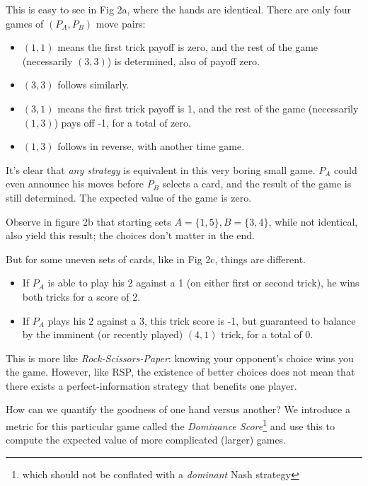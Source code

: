 \documentclass[11pt, oneside]{article} 	%
\begin{document}
This is easy to see in Fig 2a, where the hands are identical. There are only four games of $(P_A, P_B)$ move pairs:
\begin{itemize}
\item $(1,1)$ means the first trick payoff is zero, and the rest of the game (necessarily $(3,3)$) is determined, also of payoff zero.
\item $(3,3)$ follows similarly.
\item $(3,1)$ means the first trick payoff is 1, and the rest of the game (necessarily $(1,3)$) pays off -1, for a total of zero.
\item $(1,3)$ follows in reverse, with another time game.
\end{itemize}

It's clear that \emph{any strategy} is equivalent in this very boring small game. $P_A$ could even announce his moves before $P_B$ selects a card, and the result of the game is still determined. The expected value of the game is zero.

Observe in figure 2b that starting sets $A =\{1,5\}, B= \{3,4\}$, while not identical, also yield this result; the choices don't matter in the end.

But for some uneven sets of cards, like in Fig 2c, things are different.
\begin{itemize}
\item If $P_A$ is able to play his 2 against a 1 (on either first or second trick), he wins both tricks for a score of 2.
\item If $P_A$ plays his 2 against a 3, this trick score is -1, but guaranteed to balance by the imminent (or recently played) $(4,1)$ trick, for a total of 0.
\end{itemize}

This is more like \emph{Rock-Scissors-Paper}: knowing your opponent's choice wins you the game. However, like RSP, the existence of better choices does not mean that there exists a perfect-information strategy that benefits one player.

How can we quantify the goodness of one hand versus another? We introduce a metric for this particular game called the \emph{Dominance Score}\footnote{which should not be conflated with a \emph{dominant} Nash strategy}  and use this to compute the expected value of more complicated (larger) games.
\end{document}
